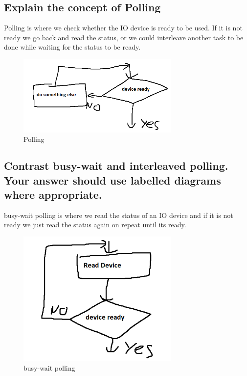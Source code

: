 \documentclass{article}
\begin{document}
\subsection{Explain the concept of Polling}
Polling is where we check whether the IO device is ready to be used. If it is not ready we go back and read the status, or we could interleave another task to be done while waiting for the status to be ready.\\
\begin{figure}[h]
    \centering
    \includegraphics[width = 80mm]{IO.PNG}
    \caption{Polling}
    \label{fig:my_label}
\end{figure}
\newpage

\subsection{Contrast busy-wait and interleaved polling. Your answer should use labelled diagrams where appropriate.}
busy-wait polling is where we read the status of an IO device and if it is not ready we just read the status again on repeat until its ready.

\begin{figure}[h]
    \centering
    \includegraphics[width = 80mm]{IO3.PNG}
    \caption{busy-wait polling}
    \label{fig:my_label}
\end{figure}
\end{document}
